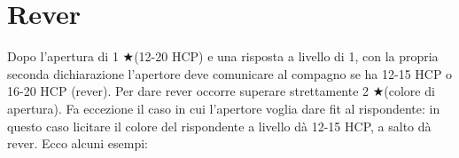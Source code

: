 \documentclass[a4paper,10pt]{article}
\renewcommand{\c}{$\clubsuit$\xspace}
\renewcommand{\d}{$\diamondsuit$\xspace}
\newcommand{\h}{$\heartsuit$\xspace}
\newcommand{\s}{$\spadesuit$\xspace}
\renewcommand{\j}{$\bigstar$\xspace}
\newcommand{\sa}{SA\xspace}
\newcommand{\smallspace}{\vskip0.3cm}
\newenvironment{twocol}
  {\smallspace\noindent\begin{tabular}{l p{0.78\textwidth}}}
  {\end{tabular}\smallspace}
\begin{document}
% 
% 
% 
% 
% 
% 
% 
% 
% 
\section{Rever}

Dopo l'apertura di 1 \j (12-20 HCP) e una risposta a livello di 1, con la propria seconda dichiarazione l'apertore deve comunicare al compagno se ha 12-15 HCP o 16-20 HCP (rever). Per dare rever occorre superare strettamente 2 \j (colore di apertura). Fa eccezione il caso in cui l'apertore voglia dare fit al rispondente: in questo caso licitare il colore del rispondente a livello dà 12-15 HCP, a salto dà rever. Ecco alcuni esempi:
\end{document}
